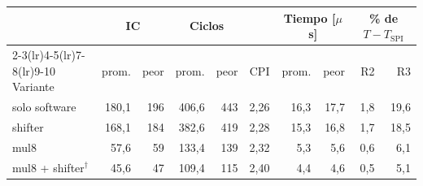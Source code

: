 \begin{tabular}{lrrrrrrrrr}
\toprule
 & \multicolumn{2}{c}{IC} & \multicolumn{2}{c}{Ciclos} & & \multicolumn{2}{c}{Tiempo [$\mu$s]} & \multicolumn{2}{c}{\% de $T-T_\text{SPI}$} \\
\cmidrule(lr){2-3}\cmidrule(lr){4-5}\cmidrule(lr){7-8}\cmidrule(lr){9-10}
Variante & prom. & peor & prom. & peor & CPI & prom. & peor & R2 & R3 \\
\midrule
solo software & 180,1 & 196 & 406,6 & 443 & 2,26 & 16,3 & 17,7 & 1,8 & 19,6 \\
shifter & 168,1 & 184 & 382,6 & 419 & 2,28 & 15,3 & 16,8 & 1,7 & 18,5 \\
mul8 & 57,6 & 59 & 133,4 & 139 & 2,32 & 5,3 & 5,6 & 0,6 & 6,1 \\
mul8 + shifter$^\dagger$ & 45,6 & 47 & 109,4 & 115 & 2,40 & 4,4 & 4,6 & 0,5 & 5,1 \\
\bottomrule
\end{tabular}
